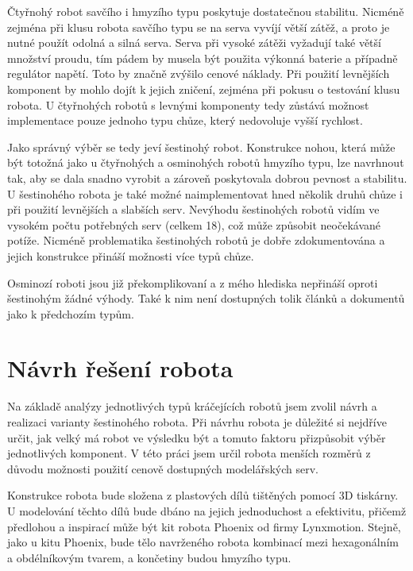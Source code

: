 Čtyřnohý robot savčího i hmyzího typu poskytuje dostatečnou stabilitu. Nicméně zejména při klusu robota savčího typu se na serva vyvíjí větší zátěž, a proto je nutné použít odolná a silná serva. Serva při vysoké zátěži vyžadují také větší množství proudu, tím pádem by musela být použita výkonná baterie a případně regulátor napětí. Toto by značně zvýšilo cenové náklady. Při použití levnějších komponent by mohlo dojít k jejich zničení, zejména při pokusu o testování klusu robota. U čtyřnohých robotů s levnými komponenty tedy zůstává možnost implementace pouze jednoho typu chůze, který nedovoluje vyšší rychlost.

Jako správný výběr se tedy jeví šestinohý robot. Konstrukce nohou, která může být totožná jako u čtyřnohých a osminohých robotů hmyzího typu, lze navrhnout tak, aby se dala snadno vyrobit a zároveň poskytovala dobrou pevnost a stabilitu. U šestinohého robota je také možné naimplementovat hned několik druhů chůze i při použití levnějších a slabších serv. Nevýhodu šestinohých robotů vidím ve vysokém počtu potřebných serv (celkem 18), což může způsobit neočekávané potíže. Nicméně problematika šestinohých robotů je dobře zdokumentována a jejich konstrukce přináší možnosti více typů chůze.

Osminozí roboti jsou již překomplikovaní a z mého hlediska nepřináší oproti šestinohým žádné výhody. Také k nim není dostupných tolik článků a dokumentů jako k předchozím typům.



\section{Návrh řešení robota}
Na základě analýzy jednotlivých typů kráčejících robotů jsem zvolil návrh a realizaci varianty šestinohého robota. Při návrhu robota je důležité si nejdříve určit, jak velký má robot ve výsledku být a tomuto faktoru přizpůsobit výběr jednotlivých komponent. V této práci jsem určil robota menších rozměrů z důvodu možnosti použití cenově dostupných modelářských serv.

Konstrukce robota bude složena z plastových dílů tištěných pomocí 3D tiskárny. U modelování těchto dílů bude dbáno na jejich jednoduchost a efektivitu, přičemž předlohou a inspirací může být kit robota Phoenix \cite{phoenix} od firmy Lynxmotion. Stejně, jako u kitu Phoenix, bude tělo navrženého robota kombinací mezi hexagonálním a obdélníkovým tvarem, a končetiny budou hmyzího typu.

